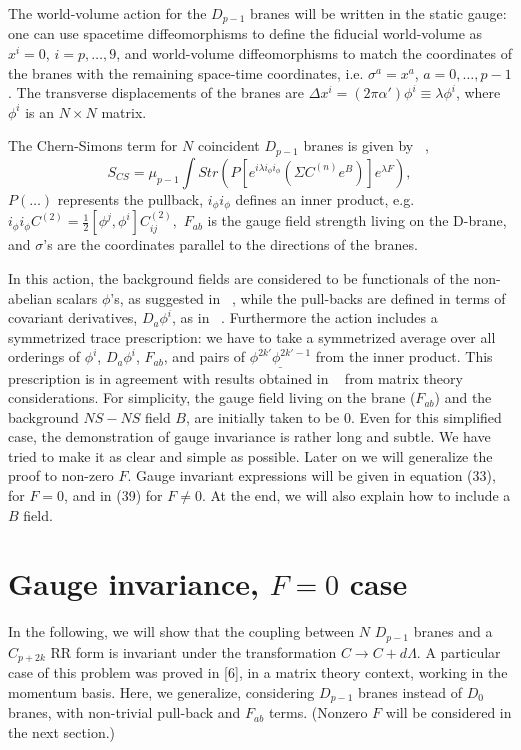 \documentclass[a4paper,12pt]{article}
\begin{document}
   The world-volume action for the $D_{p-1}$ branes will be written in the static gauge: one can use spacetime diffeomorphisms to define the fiducial world-volume as $x^i=0$, $i=p,\ldots,9$, and world-volume diffeomorphisms to match the coordinates of the branes with the remaining space-time coordinates, i.e. $\sigma^a=x^a$, $a=0,\ldots,p-1$. The transverse displacements of the branes are  $\Delta x^i=(2 \pi \alpha')\phi^i \equiv \lambda \phi^i$, where $\phi^i$ is an $N \times N$ matrix. 


   The Chern-Simons term for $N$ coincident $D_{p-1}$ branes is given by ~\cite{myers},
\begin{equation}
S_{CS}=\mu_{p-1}\int Str\left(P \left[ e^{i\lambda i_\phi i_\phi} \left(\Sigma C^{\left(n\right)}e^B\right)\right]e^{\lambda F}\right),
\end{equation}
   $P(\ldots )$ represents the pullback, 
   $i_\phi i_\phi$ defines an inner product, e.g. $i_\phi i_\phi C^{(2)} = \frac{1}{2}\left[\phi^j,\phi^i\right]C^{(2)}_{ij},$
   $F_{ab}$ is the gauge field strength living on the D-brane, and
   $\sigma$'s are the coordinates parallel to the directions of the branes.
  

    In this action, the background fields are considered to be functionals of the non-abelian scalars $\phi$'s, as suggested in ~\cite{douglas}, while the pull-backs are defined in terms of covariant derivatives, $D_a\phi^i$, as in ~\cite{hull}. Furthermore the action includes a symmetrized trace prescription: we have to take  a symmetrized average over all orderings of $\phi^i$, $D_a\phi^i$, $F_{ab}$, and pairs of $\underline{\phi^{2k'}\phi^{2k'-1}}$ from the inner product. This prescription is in agreement with results obtained in ~\cite{taylor2} from matrix theory considerations.  
    For simplicity, the gauge field living on the brane ($F_{ab}$) and the background $NS-NS$ field $B$, are initially taken to be 0. Even for this simplified case, the demonstration of gauge invariance is rather long and subtle. We have tried to make it as clear and simple as possible. Later on we will generalize the proof to non-zero $F$. Gauge invariant expressions will be given in equation (33), for $F=0$, and in (39) for $F\neq0$. At the end, we will also explain how to include a $B$ field.  
   



\section{ Gauge invariance,  $F=0$ case}
     In the following, we will show that the coupling between $N$ $D_{p-1}$ branes and a $C_{p+2k}$ RR form is invariant under the transformation $C\rightarrow C+d\Lambda$. A particular case of this problem was proved in [6], in a matrix
 theory context, working in the momentum basis. Here, we generalize, considering $D_{p-1}$ branes instead of $D_0$ branes, with non-trivial pull-back and $F_{ab}$  terms. (Nonzero $F$ will be considered in the next section.)
\end{document}
